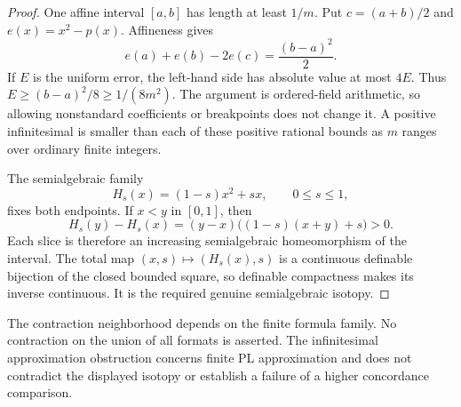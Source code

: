 \begin{proof}
One affine interval $[a,b]$ has length at least $1/m$.  Put
$c=(a+b)/2$ and $e(x)=x^2-p(x)$.  Affineness gives
\[
 e(a)+e(b)-2e(c)=\frac{(b-a)^2}{2}.
\]
If $E$ is the uniform error, the left-hand side has absolute value
at most $4E$.  Thus $E\geq(b-a)^2/8\geq1/(8m^2)$.
The argument is ordered-field arithmetic, so allowing nonstandard
coefficients or breakpoints does not change it.  A positive
infinitesimal is smaller than each of these positive rational bounds
as $m$ ranges over ordinary finite integers.

The semialgebraic family
\[
 H_s(x)=(1-s)x^2+sx,\qquad 0\leq s\leq1,
\]
fixes both endpoints.  If $x<y$ in $[0,1]$, then
\[
 H_s(y)-H_s(x)=(y-x)\bigl((1-s)(x+y)+s\bigr)>0.
\]
Each slice is therefore an increasing semialgebraic homeomorphism
of the interval.  The total map $(x,s)\mapsto(H_s(x),s)$ is a
continuous definable bijection of the closed bounded square, so
definable compactness makes its inverse continuous.  It is the
required genuine semialgebraic isotopy.
\end{proof}

The contraction neighborhood depends on the finite formula family.
No contraction on the union of all formats is asserted.  The
infinitesimal approximation obstruction concerns finite PL
approximation and does not contradict the displayed isotopy or
establish a failure of a higher concordance comparison.
